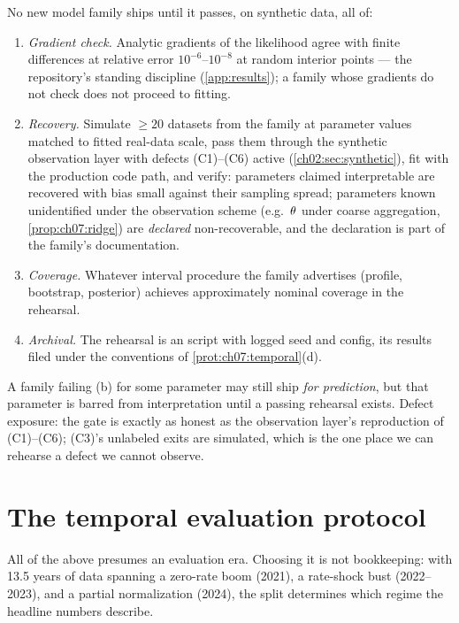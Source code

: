 \begin{protocol}\label{prot:ch07:recovery}
No new model family ships until it passes, on synthetic data, all of:
\begin{enumerate}[label=(\alph*)]
\item \emph{Gradient check.} Analytic gradients of the likelihood agree
with finite differences at relative error $10^{-6}$--$10^{-8}$ at random
interior points --- the repository's standing discipline
(\cref{app:results}); a family whose gradients do not check does not
proceed to fitting.
\item \emph{Recovery.} Simulate $\ge 20$ datasets from the family at
parameter values matched to fitted real-data scale, pass them through
the synthetic observation layer with defects (C1)--(C6) active
(\cref{ch02:sec:synthetic}), fit with the production code path, and
verify: parameters claimed interpretable are recovered with bias small
against their sampling spread; parameters known unidentified under the
observation scheme (e.g.\ $\theta$ under coarse aggregation,
\cref{prop:ch07:ridge}) are \emph{declared} non-recoverable, and the
declaration is part of the family's documentation.
\item \emph{Coverage.} Whatever interval procedure the family advertises
(profile, bootstrap, posterior) achieves approximately nominal coverage
in the rehearsal.
\item \emph{Archival.} The rehearsal is an  script
with logged seed and config, its results filed under the conventions of
\cref{prot:ch07:temporal}(d).
\end{enumerate}
A family failing (b) for some parameter may still ship \emph{for
prediction}, but that parameter is barred from interpretation until a
passing rehearsal exists. Defect exposure: the gate is exactly as honest
as the observation layer's reproduction of (C1)--(C6); (C3)'s unlabeled
exits are simulated, which is the one place we can rehearse a defect we
cannot observe.
\end{protocol}

\section{The temporal evaluation protocol}\label{ch07:sec:temporal}

All of the above presumes an evaluation era. Choosing it is not
bookkeeping: with 13.5 years of data spanning a zero-rate boom (2021), a
rate-shock bust (2022--2023), and a partial normalization (2024), the
split determines which regime the headline numbers describe.

